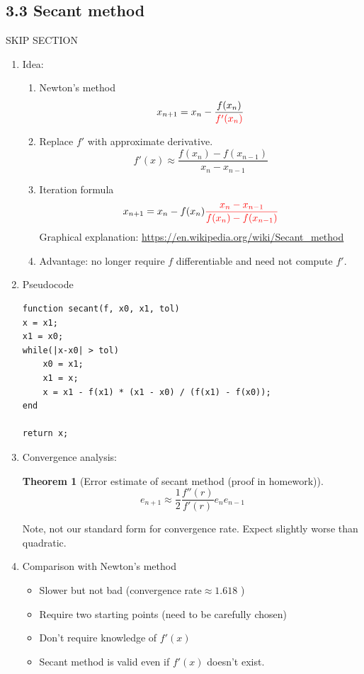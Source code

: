 \documentclass{article}
\newtheorem{thm}{Theorem}[section]
\theoremstyle{remark}
\begin{document}
\subsection{3.3 Secant method}

SKIP SECTION

\begin{enumerate}
\item Idea: 
\begin{enumerate}
\item Newton's method
$$
x_{n+1} = x_n - \frac{f(x_n)}{{\color{red} f'(x_n)}}
$$
\item Replace $f'$ with approximate derivative.
$$
f'(x) \approx \frac{f(x_n)-f(x_{n-1})}{x_n-x_{n-1}}
$$
\item Iteration formula
$$
x_{n+1} = x_n - f(x_n){\color{red}\frac{x_n-x_{n-1}}{f(x_n)-f(x_{n-1})}}
$$
Graphical explanation: \url{https://en.wikipedia.org/wiki/Secant_method}
\item Advantage: no longer require $f$ differentiable and need not compute $f'$. 
\end{enumerate}

\item Pseudocode
\begin{verbatim}
function secant(f, x0, x1, tol)
x = x1;
x1 = x0;
while(|x-x0| > tol)
    x0 = x1;
    x1 = x;
    x = x1 - f(x1) * (x1 - x0) / (f(x1) - f(x0));
end

return x;
\end{verbatim}

\item Convergence analysis: 
\begin{thm}[Error estimate of secant method (proof in homework)]
$$
e_{n+1} \approx \frac{1}{2}\frac{f''(r)}{f'(r)}e_ne_{n-1}
$$
\end{thm}
Note, not our standard form for convergence rate. Expect slightly worse than quadratic.

\item Comparison with Newton's method
\begin{itemize}
\item Slower but not bad (convergence rate$ \approx 1.618$ )
\item Require two starting points (need to be carefully chosen)
\item Don't require knowledge of $f'(x)$
\item Secant method is valid even if $f'(x)$ doesn't exist.
\end{itemize}


\end{enumerate}
\end{document}
